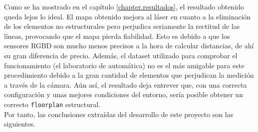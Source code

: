 Como se ha mostrado en el capítulo \ref{chapter.resultados}, el resultado obtenido queda lejos lo ideal. El mapa obtenido mejora al láser en cuanto a la eliminación de los elementos no estructurales pero perjudica seriamente la rectitud de las líneas, provocando que el mapa pierda fiabilidad. Esto es debido a que los sensores RGBD son mucho menos precisos a la hora de calcular distancias, de ahí su gran diferencia de precio. Además, el dataset utilizado para comprobar el funcionamiento (el laboratorio de automática) no es el más amigable para este procedimiento debido a la gran cantidad de elementos que perjudican la medición a través de la cámara. Aún así, el resultado deja entrever que, con una correcta configuración y unas mejores condiciones del entorno, sería posible obtener un correcto \texttt{floorplan} estructural.\\

Por tanto, las conclusiones extraídas del desarrollo de este proyecto son las siguientes.

